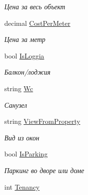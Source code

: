 \begin{DoxyCompactItemize}
\begin{DoxyCompactList}\small\item\em Цена за весь объект \end{DoxyCompactList}\item 
decimal \hyperlink{class_r_t_1_1_parsing_libs_1_1_models_1_1_realty_additional_info_a748d3e4584bfcbfb157781497f27c5ab}{Cost\+Per\+Meter}
\begin{DoxyCompactList}\small\item\em Цена за метр \end{DoxyCompactList}\item 
bool \hyperlink{class_r_t_1_1_parsing_libs_1_1_models_1_1_realty_additional_info_adc0122a3b59b56c2231c5c06f1245f22}{Is\+Loggia}
\begin{DoxyCompactList}\small\item\em Балкон/лоджия \end{DoxyCompactList}\item 
string \hyperlink{class_r_t_1_1_parsing_libs_1_1_models_1_1_realty_additional_info_aedcbc8e48fa63f3705c88bf73ed4a265}{Wc}
\begin{DoxyCompactList}\small\item\em Санузел \end{DoxyCompactList}\item 
string \hyperlink{class_r_t_1_1_parsing_libs_1_1_models_1_1_realty_additional_info_a631100f22c2651ccb17c279fa3eee358}{View\+From\+Property}
\begin{DoxyCompactList}\small\item\em Вид из окон \end{DoxyCompactList}\item 
bool \hyperlink{class_r_t_1_1_parsing_libs_1_1_models_1_1_realty_additional_info_afe747cb54823715884003f2440b95f16}{Is\+Parking}
\begin{DoxyCompactList}\small\item\em Паркинг во дворе или доме \end{DoxyCompactList}\item 
int \hyperlink{class_r_t_1_1_parsing_libs_1_1_models_1_1_realty_additional_info_a1e175c5a4c34af76b575b7b640d189a9}{Tenancy}

\end{DoxyCompactItemize}
